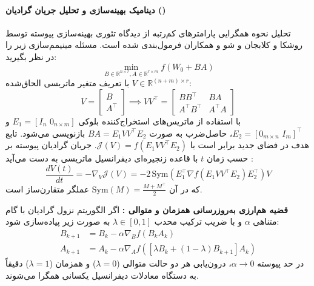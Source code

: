 \paragraph*{دینامیک بهینه‌سازی و تحلیل جریان گرادیان ()}
تحلیل نحوه همگرایی پارامترهای کم‌رتبه  از دیدگاه تئوری بهینه‌سازی پیوسته توسط روشکا و کلابجان \cite{rushka2026rank} و شو و همکاران \cite{xu2025understanding} فرمول‌بندی شده است. مسئله مینیمم‌سازی زیر را در نظر بگیرید:
\begin{equation}
    \min_{B \in \mathbb{R}^{n \times r}, A \in \mathbb{R}^{r \times m}} f(W_0 + BA)
\end{equation}
با تعریف متغیر ماتریسی الحاق‌شده $V \in \mathbb{R}^{(n+m) \times r}$:
\begin{equation}
    V = \begin{bmatrix} B \\ A^\top \end{bmatrix} \implies V V^\top = \begin{bmatrix} BB^\top & BA \\ A^\top B^\top & A^\top A \end{bmatrix}
\end{equation}
با استفاده از ماتریس‌های استخراج‌کننده بلوکی $E_1 = [I_n \,\, 0_{n \times m}]$ و $E_2 = [0_{m \times n} \,\, I_m]^\top$، حاصل‌ضرب به صورت $BA = E_1 V V^\top E_2$ بازنویسی می‌شود. تابع هدف در فضای جدید برابر است با $\mathcal{J}(V) = f(E_1 V V^\top E_2)$. جریان گرادیان پیوسته بر حسب زمان $t$ با قاعده زنجیره‌ای دیفرانسیل ماتریسی به دست می‌آید \cite{rushka2026rank}:
\begin{equation}
    \frac{dV(t)}{dt} = -\nabla_V \mathcal{J}(V) = -2 \, \text{Sym}\left( E_1^\top \nabla f(E_1 V V^\top E_2) E_2^\top \right) V
\end{equation}
که در آن $\text{Sym}(M) = \frac{M + M^\top}{2}$ عملگر متقارن‌ساز است.

\textbf{قضیه هم‌ارزی به‌روزرسانی همزمان و متوالی \cite{rushka2026rank}:} اگر الگوریتم نزول گرادیان با گام متناهی $\alpha$ و با ضریب ترکیب محدب $\lambda \in [0, 1]$ به صورت زیر پیاده‌سازی شود:
\begin{align}
    B_{k+1} &= B_k - \alpha \nabla_B f(B_k A_k) \\
    A_{k+1} &= A_k - \alpha \nabla_A f([\lambda B_k + (1-\lambda)B_{k+1}] A_k)
\end{align}
در حد پیوسته $\alpha \to 0$، درون‌یابی هر دو حالت متوالی ($\lambda = 0$) و همزمان ($\lambda = 1$) دقیقاً به دستگاه معادلات دیفرانسیل یکسانی همگرا می‌شوند.

